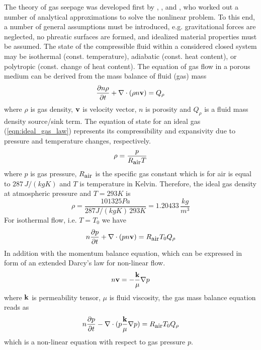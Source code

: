 The theory of gas seepage was developed
first by \cite{Muskat:1937}, \cite{Leibenzon:1947}, and \cite{AraNum:1965}, who worked out a number of analytical approximations to
solve the nonlinear problem. To this end, a number of general
assumptions must be introduced, e.g. gravitational forces are
neglected, no phreatic surfaces are formed, and idealized material
properties must be assumed. The state of the compressible fluid
within a considered closed system may be isothermal (const.
temperature), adiabatic (const. heat content), or polytropic
(const. change of heat content).
%
The equation of gas flow in a porous medium can be derived from
the mass balance of fluid (gas) mass
%
\begin{equation}
\frac{\partial n \rho}{\partial t}
+
\nabla \cdot (\rho n {\mathbf{v}})
=
Q_\rho
\label{eqn:fluid_mass_1}
\end{equation}
%
where $\rho$ is gas density, ${\mathbf{v}}$ is velocity
vector, $n$ is porosity and $Q_\rho$ is a fluid mass density source/sink term.
%
The equation of state for an ideal gas (\ref{eqn:ideal_gas_law})
represents its compressibility and expansivity due to pressure and
temperature changes, respectively.
%
\begin{equation}
\rho
=
\frac{p}{R_{\mbox{\small air}}T}
\label{eqn:ideal_gas_law}
\end{equation}
%
where $p$ is gas pressure, $R_{\mbox{\small air}}$ is the specific gas constant which is for
air is equal to $287\,J/(kg K)$ and $T$ is
temperature in Kelvin. Therefore, the ideal gas density at atmospheric
pressure and $T=293K$ is
%
\begin{equation}
\rho
=
\frac{101325 Pa}{287 J/(kg K)\,293 K}
=
1.20433\,\frac{kg}{m^3}
\end{equation}
%
For isothermal flow, i.e. $T=T_0$ we have
%
\begin{equation}
n \frac{\partial p}{\partial t}
+
\nabla \cdot (p n {\mathbf{v}})
=
R_{\mbox{\small air}} T_0 Q_\rho
\end{equation}
%
In addition with the momentum balance equation, which can be
expressed in form of an extended Darcy's law for non-linear flow.
%
\begin{equation}
n{\mathbf{v}}
=
-\frac{\mathbf{k}}{\mu}
\nabla p
\label{eqn:darcy_gas}
\end{equation}
%
where $\mathbf{k}$ is permeability tensor, $\mu$
is fluid viscosity,
%
the gas mass balance equation reads as
%
\begin{equation}
n\frac{\partial p}{\partial t}
-
\nabla \cdot
(p\frac{\mathbf{k}}{\mu}\nabla p)
=
R_{\mbox{\small air}} T_0 Q_\rho
\end{equation}
%
which is a non-linear equation with respect to gas pressure $p$.

